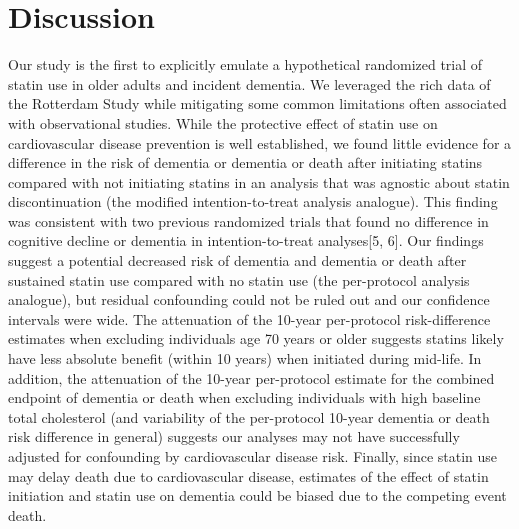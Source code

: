 \documentclass[
]{book}
\begin{document}
\hypertarget{discussion}{%
\section{Discussion}\label{discussion}}

Our study is the first to explicitly emulate a hypothetical randomized trial of statin use in older adults and incident dementia. We leveraged the rich data of the Rotterdam Study while mitigating some common limitations often associated with observational studies. While the protective effect of statin use on cardiovascular disease prevention is well established, we found little evidence for a difference in the risk of dementia or dementia or death after initiating statins compared with not initiating statins in an analysis that was agnostic about statin discontinuation (the modified intention-to-treat analysis analogue). This finding was consistent with two previous randomized trials that found no difference in cognitive decline or dementia in intention-to-treat analyses{[}5, 6{]}. Our findings suggest a potential decreased risk of dementia and dementia or death after sustained statin use compared with no statin use (the per-protocol analysis analogue), but residual confounding could not be ruled out and our confidence intervals were wide. The attenuation of the 10-year per-protocol risk-difference estimates when excluding individuals age 70 years or older suggests statins likely have less absolute benefit (within 10 years) when initiated during mid-life. In addition, the attenuation of the 10-year per-protocol estimate for the combined endpoint of dementia or death when excluding individuals with high baseline total cholesterol (and variability of the per-protocol 10-year dementia or death risk difference in general) suggests our analyses may not have successfully adjusted for confounding by cardiovascular disease risk. Finally, since statin use may delay death due to cardiovascular disease, estimates of the effect of statin initiation and statin use on dementia could be biased due to the competing event death.
\end{document}
